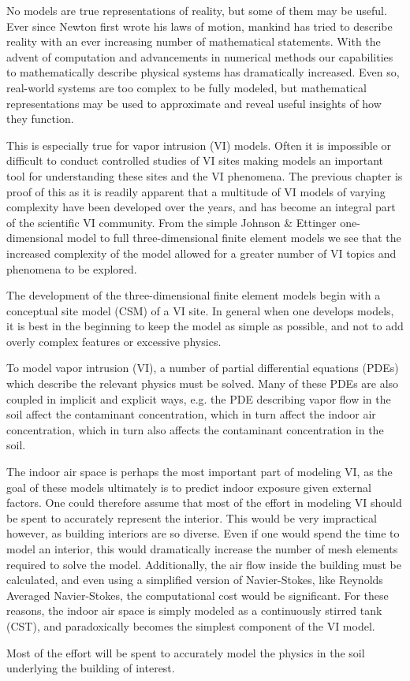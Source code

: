No models are true representations of reality, but some of them may be useful.
Ever since Newton first wrote his laws of motion, mankind has tried to describe reality with an ever increasing number of mathematical statements.
With the advent of computation and advancements in numerical methods our capabilities to mathematically describe physical systems has dramatically increased.
Even so, real-world systems are too complex to be fully modeled, but mathematical representations may be used to approximate and reveal useful insights of how they function.\par

This is especially true for vapor intrusion (VI) models.
Often it is impossible or difficult to conduct controlled studies of VI sites making models an important tool for understanding these sites and the VI phenomena.
The previous chapter is proof of this as it is readily apparent that a multitude of VI models of varying complexity have been developed over the years, and has become an integral part of the scientific VI community.
From the simple Johnson \& Ettinger one-dimensional model to full three-dimensional finite element models we see that the increased complexity of the model allowed for a greater number of VI topics and phenomena to be explored.\par

The development of the three-dimensional finite element models begin with a conceptual site model (CSM) of a VI site.
In general when one develops models, it is best in the beginning to keep the model as simple as possible, and not to add overly complex features or excessive physics.


To model vapor intrusion (VI), a number of partial differential equations (PDEs) which describe the relevant physics must be solved.
Many of these PDEs are also coupled in implicit and explicit ways, e.g. the PDE describing vapor flow in the soil affect the contaminant concentration, which in turn affect the indoor air concentration, which in turn also affects the contaminant concentration in the soil.

The indoor air space is perhaps the most important part of modeling VI, as the goal of these models ultimately is to predict indoor exposure given external factors.
One could therefore assume that most of the effort in modeling VI should be spent to accurately represent the interior.
This would be very impractical however, as building interiors are so diverse.
Even if one would spend the time to model an interior, this would dramatically increase the number of mesh elements required to solve the model.
Additionally, the air flow inside the building must be calculated, and even using a simplified version of Navier-Stokes, like Reynolds Averaged Navier-Stokes, the computational cost would be significant.
For these reasons, the indoor air space is simply modeled as a continuously stirred tank (CST), and paradoxically becomes the simplest component of the VI model.\par

Most of the effort will be spent to accurately model the physics in the soil underlying the building of interest.
